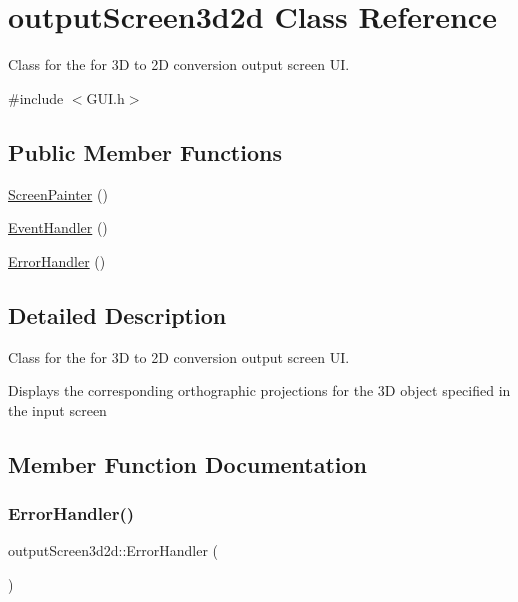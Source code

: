 \hypertarget{classoutput_screen3d2d}{}\section{output\+Screen3d2d Class Reference}
\label{classoutput_screen3d2d}


Class for the for 3D to 2D conversion output screen UI.  




{\ttfamily \#include $<$G\+U\+I.\+h$>$}

\subsection*{Public Member Functions}
\begin{DoxyCompactItemize}
\item 
\mbox{\hyperlink{classoutput_screen3d2d_aacf51b800ca899603b25faafd69611a5}{Screen\+Painter}} ()
\item 
\mbox{\hyperlink{classoutput_screen3d2d_a4624964767f34df730144d49676c4816}{Event\+Handler}} ()
\item 
\mbox{\hyperlink{classoutput_screen3d2d_adf23d1bdf5473a4a3e4f14956f764567}{Error\+Handler}} ()
\end{DoxyCompactItemize}


\subsection{Detailed Description}
Class for the for 3D to 2D conversion output screen UI. 

Displays the corresponding orthographic projections for the 3D object specified in the input screen 

\subsection{Member Function Documentation}
\mbox{\label{classoutput_screen3d2d_adf23d1bdf5473a4a3e4f14956f764567}} 
\subsubsection{\texorpdfstring{Error\+Handler()}{ErrorHandler()}}
{\footnotesize\ttfamily output\+Screen3d2d\+::\+Error\+Handler (\begin{DoxyParamCaption}{ }\end{DoxyParamCaption})}

